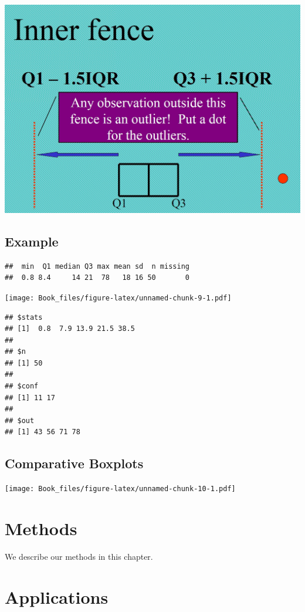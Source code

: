 \documentclass[]{book}
\begin{document}
\includegraphics{pic17.png}

\hypertarget{example-6}{%
\section{Example}\label{example-6}}

\begin{verbatim}
##  min  Q1 median Q3 max mean sd  n missing
##  0.8 8.4     14 21  78   18 16 50       0
\end{verbatim}

\texttt{[image: Book\_files/figure-latex/unnamed-chunk-9-1.pdf]}

\begin{verbatim}
## $stats
## [1]  0.8  7.9 13.9 21.5 38.5
## 
## $n
## [1] 50
## 
## $conf
## [1] 11 17
## 
## $out
## [1] 43 56 71 78
\end{verbatim}

\hypertarget{comparative-boxplots}{%
\section{Comparative Boxplots}\label{comparative-boxplots}}

\texttt{[image: Book\_files/figure-latex/unnamed-chunk-10-1.pdf]}

\hypertarget{methods}{%
\chapter{Methods}\label{methods}}

We describe our methods in this chapter.

\hypertarget{applications}{%
\chapter{Applications}\label{applications}}
\end{document}
